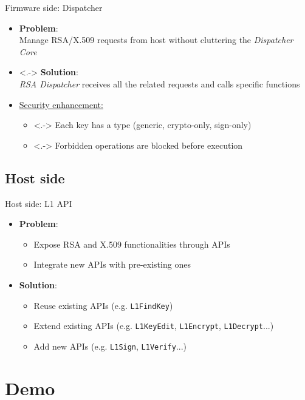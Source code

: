\documentclass[aspectratio=169]{beamer}
\begin{document}
\begin{frame}{Firmware side: Dispatcher}
	\begin{itemize}[<+->]
		\item \textbf{Problem}:\\
			Manage RSA/X.509 requests from host without cluttering
			the \emph{Dispatcher Core}
		\item<.-> \textbf{Solution}:\\
			\emph{RSA Dispatcher} receives all the related requests
			and calls specific functions
		\item \ul{Security enhancement:}\\
			\begin{itemize}
				\item<.-> Each key has a type (generic,
					crypto-only, sign-only)
				\item<.-> Forbidden operations are blocked
					before execution
			\end{itemize}
	\end{itemize}
\end{frame}
\subsection{Host side}
\begin{frame}{Host side: L1 API}
	\begin{itemize}
		\item \textbf{Problem}:\\
			\begin{itemize}
				\item Expose RSA and X.509 functionalities
					through APIs
				\item Integrate new APIs with pre-existing ones
			\end{itemize}
		\item \textbf{Solution}:
			\begin{itemize}
				\item Reuse existing APIs (e.g.
					\texttt{L1FindKey})
				\item Extend existing APIs (e.g.
					\texttt{L1KeyEdit}, \texttt{L1Encrypt},
					\texttt{L1Decrypt}...)
				\item Add new APIs (e.g. \texttt{L1Sign},
					\texttt{L1Verify}...)
			\end{itemize}
	\end{itemize}
\end{frame}
\section{Demo}
\end{document}
